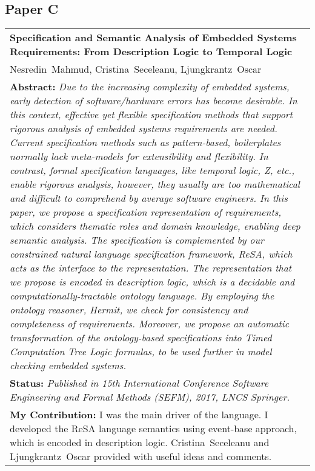 \subsection{Paper C}
\begin{tabular}{p{\textwidth}}
\textbf{Specification and Semantic Analysis of Embedded Systems Requirements: From  Description Logic to Temporal Logic}\\%
Nesredin~Mahmud, Cristina~Seceleanu, Ljungkrantz~Oscar\\[6pt]%
\textbf{Abstract:} \textit{Due to the increasing complexity of embedded systems, early detection of software/hardware errors has become desirable. In this context, effective yet flexible specification methods that support rigorous analysis of embedded systems requirements are needed. Current specification methods such as pattern-based, boilerplates normally lack meta-models for extensibility and flexibility. In contrast, formal specification languages, like temporal logic, Z, etc., enable rigorous analysis, however, they usually are too mathematical and difficult to comprehend by average software engineers. In this paper, we propose a specification representation of requirements, which considers thematic roles and domain knowledge, enabling deep semantic analysis. The specification is complemented by our constrained natural language specification framework, ReSA, which acts as the interface to the representation. The representation that we propose is encoded in description logic, which is a decidable and computationally-tractable ontology language. By employing the ontology reasoner, Hermit, we check for consistency and completeness of requirements. Moreover, we propose an automatic transformation of the ontology-based specifications into Timed Computation Tree Logic formulas, to be used further in model checking embedded systems.}\\[6pt]%
\textbf{Status:} \textit{Published in 15th International Conference Software Engineering and Formal Methods (SEFM), 2017, LNCS Springer.}\\%
\textbf{My Contribution: } I was the main driver of the language. I developed the ReSA language semantics using event-base approach, which is encoded in description logic. Cristina~Seceleanu and Ljungkrantz~Oscar provided with useful ideas and comments.\\%
\end{tabular}

